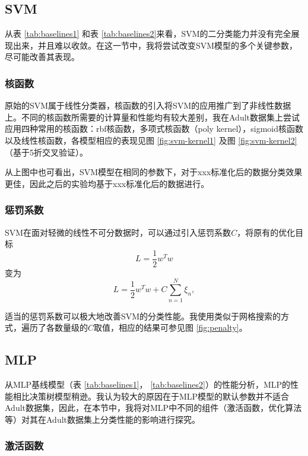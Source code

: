 \documentclass[12pt,a4paper]{article}
\theoremstyle{definition}
\begin{document}
\subsection{SVM}

从表 \ref{tab:baselines1} 和表 \ref{tab:baselines2}来看，SVM的二分类能力并没有完全展现出来，并且难以收敛。在这一节中，我将尝试改变SVM模型的多个关键参数，尽可能改善其表现。

\subsubsection{核函数}

原始的SVM属于线性分类器，核函数的引入将SVM的应用推广到了非线性数据上。不同的核函数所需要的计算量和性能均有较大差别，我在Adult数据集上尝试应用四种常用的核函数：rbf核函数，多项式核函数（poly kernel），sigmoid核函数以及线性核函数，各模型相应的表现见图 \ref{fig:svm-kernel1} 及图 \ref{fig:svm-kernel2}（基于5折交叉验证）。

\vspace{0.01\linewidth}
从上图中也可看出，SVM模型在相同的参数下，对于xxx标准化后的数据分类效果更佳，因此之后的实验均基于xxx标准化后的数据进行。

\subsubsection{惩罚系数}

SVM在面对轻微的线性不可分数据时，可以通过引入惩罚系数$C$，将原有的优化目标
\begin{equation}
	L = \dfrac{1}{2}w^Tw
\end{equation}
变为
\begin{equation}
	L = \dfrac{1}{2}w^Tw+C\sum\limits_{n=1}^{N}\xi_n,
\end{equation}

适当的惩罚系数可以极大地改善SVM的分类性能。我使用类似于网格搜索的方式，遍历了各数量级的$C$取值，相应的结果可参见图 \ref{fig:penalty}。

\subsection{MLP}

从MLP基线模型（表 \ref{tab:baselines1}， \ref{tab:baselines2}）的性能分析，MLP的性能相比决策树模型稍逊。我认为较大的原因在于MLP模型的默认参数并不适合Adult数据集，因此，在本节中，我将对MLP中不同的组件（激活函数，优化算法等）对其在Adult数据集上分类性能的影响进行探究。

\subsubsection{激活函数}
\end{document}
